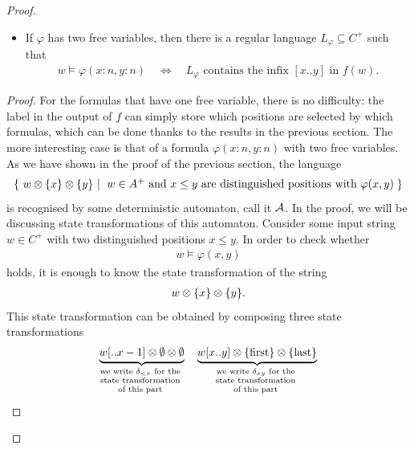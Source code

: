 \begin{proof}
\begin{lemma}
\begin{itemize}
            \item If $\varphi$ has two free variables, then there is a regular language $L_\varphi \subseteq C^+$ such that 
            \begin{align*}            w \models \varphi(x: n, y : n) \quad \iff \quad L_\varphi \text{ contains the infix  $[x..y]$ in $f(w)$.}
            \end{align*}
        \end{itemize}
    \end{lemma}

    \begin{proof} For the formulas that have one free variable, there is no difficulty: the label in the output of $f$ can simply store which positions are selected by which formulas, which can be done thanks to the results in the previous section. The more interesting case is that of a formula $\varphi(x:n, y:n)$ with two free variables.
        As we have shown in the proof of the previous section, the language
        \begin{align*}
        \setbuild{w  \otimes \set{x} \otimes \set{y}}{$w \in A^+$ and $x \leq y$ are distinguished positions with $\varphi(x,y)$}
        \end{align*}
        is recognised by some deterministic automaton, call it ${\mathcal A}$. In the proof, we will be discussing state transformations of this automaton.  Consider some input string $w \in C^+$ with two distinguished positions $ x \leq y$. In order to check whether
        \begin{align*}
            w \models \varphi(x,y)
        \end{align*}
        holds, it is enough to know the state transformation of the string 
        \begin{align}\label{eq:state-transformation-for-logic}
         w \otimes \{x\} \otimes \{y\}.
        \end{align}
        This state  transformation  can be obtained by composing three state transformations
        \begin{align*}
        \myunderbrace{w[..x-1] \otimes \emptyset \otimes \emptyset}{we write $\delta_{<x}$ for the \\  state transformation \\ of this part}
        \quad 
        \myunderbrace{w[ x .. y ] \otimes \set{\text{first}} \otimes \set{\text{last}}}{we write $\delta_{xy}$ for the \\ state transformation \\ of this part}

\end{align*}
\end{proof}
\end{proof}
